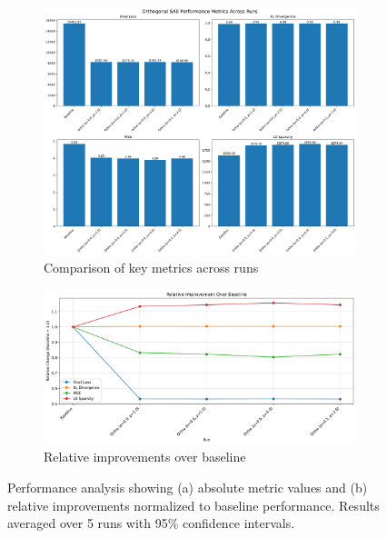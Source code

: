 \documentclass{article} %
\begin{document}
\begin{figure}[h]
    \centering
    \begin{subfigure}{0.49\textwidth}
        \includegraphics[width=\textwidth]{metrics_comparison.png}
        \caption{Comparison of key metrics across runs}
        \label{fig:metrics}
    \end{subfigure}
    \hfill
    \begin{subfigure}{0.49\textwidth}
        \includegraphics[width=\textwidth]{relative_improvements.png}
        \caption{Relative improvements over baseline}
        \label{fig:improvements}
    \end{subfigure}
    \caption{Performance analysis showing (a) absolute metric values and (b) relative improvements normalized to baseline performance. Results averaged over 5 runs with 95\% confidence intervals.}
    \label{fig:results}
\end{figure}
\end{document}
